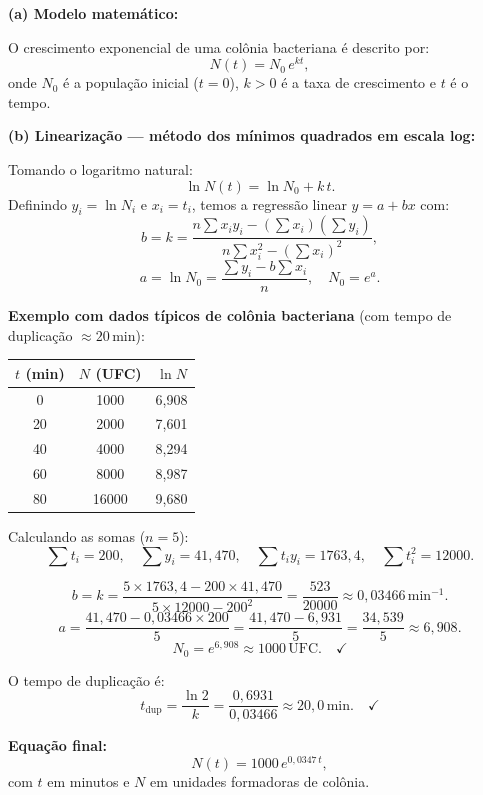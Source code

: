 \textbf{(a) Modelo matemático:}

O crescimento exponencial de uma colônia bacteriana é descrito por:
\[
N(t)=N_0\,e^{kt},
\]
onde $N_0$ é a população inicial ($t=0$), $k>0$ é a taxa de crescimento e $t$ é o tempo.

\textbf{(b) Linearização — método dos mínimos quadrados em escala log:}

Tomando o logaritmo natural:
\[
\ln N(t) = \ln N_0 + k\,t.
\]
Definindo $y_i = \ln N_i$ e $x_i = t_i$, temos a regressão linear $y=a+bx$ com:
\[
b = k = \frac{n\sum x_i y_i - (\sum x_i)(\sum y_i)}{n\sum x_i^2 - (\sum x_i)^2},
\]
\[
a = \ln N_0 = \frac{\sum y_i - b\sum x_i}{n}, \quad N_0=e^a.
\]

\textbf{Exemplo com dados típicos de colônia bacteriana}
(com tempo de duplicação $\approx 20\,\mathrm{min}$):

\begin{center}
\begin{tabular}{ccc}
\hline
$t$ (min) & $N$ (UFC) & $\ln N$ \\
\hline
0 & 1000 & 6{,}908 \\
20 & 2000 & 7{,}601 \\
40 & 4000 & 8{,}294 \\
60 & 8000 & 8{,}987 \\
80 & 16000 & 9{,}680 \\
\hline
\end{tabular}
\end{center}

Calculando as somas ($n=5$):
\[
\sum t_i = 200,\quad \sum y_i = 41{,}470,\quad \sum t_i y_i = 1763{,}4,\quad \sum t_i^2=12000.
\]

\[
b = k = \frac{5\times1763{,}4 - 200\times41{,}470}{5\times12000 - 200^2}
= \frac{523}{20000}\approx0{,}03466\,\mathrm{min}^{-1}.
\]
\[
a=\frac{41{,}470 - 0{,}03466\times200}{5}=\frac{41{,}470-6{,}931}{5}=\frac{34{,}539}{5}\approx6{,}908.
\]
\[
N_0=e^{6{,}908}\approx1000\,\text{UFC}. \quad\checkmark
\]

O tempo de duplicação é:
\[
t_{\text{dup}}=\frac{\ln 2}{k}=\frac{0{,}6931}{0{,}03466}\approx20{,}0\,\mathrm{min}.\quad\checkmark
\]

\textbf{Equação final:}
\[
\boxed{N(t)=1000\,e^{0{,}0347\,t},}
\]
com $t$ em minutos e $N$ em unidades formadoras de colônia.

